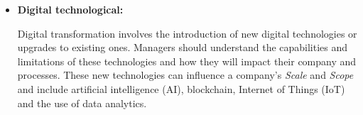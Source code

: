 \documentclass[a4]{scrartcl}
\begin{document}
\begin{itemize}
	
	\item \textbf{Digital technological:} 
	
	Digital transformation involves the introduction of new digital technologies or upgrades to existing ones. Managers should understand the capabilities and limitations of these technologies and how they will impact their company and processes. These new technologies can influence a company's \textit{Scale} and \textit{Scope} and include artificial intelligence (AI), blockchain, Internet of Things (IoT) and the use of data analytics.~\cite{AI,DDDM,  iot, blockchain}
	
	
	
	
	
	
	
\end{itemize}




	
	
\end{document}
